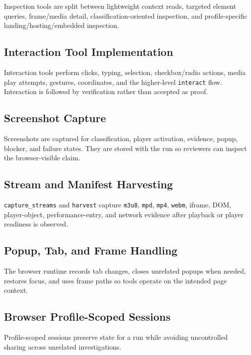 Inspection tools are split between lightweight context reads, targeted element
queries, frame/media detail, classification-oriented inspection, and
profile-specific landing/hosting/embedded inspection.

\subsection{Interaction Tool Implementation}

Interaction tools perform clicks, typing, selection, checkbox/radio actions,
media play attempts, gestures, coordinates, and the higher-level
\texttt{interact} flow. Interaction is followed by verification rather than
accepted as proof.

\subsection{Screenshot Capture}

Screenshots are captured for classification, player activation, evidence,
popup, blocker, and failure states. They are stored with the run so reviewers
can inspect the browser-visible claim.

\subsection{Stream and Manifest Harvesting}

\texttt{capture\_streams} and \texttt{harvest} capture \texttt{m3u8},
\texttt{mpd}, \texttt{mp4}, \texttt{webm}, iframe, DOM, player-object,
performance-entry, and network evidence after playback or player readiness is
observed.

\subsection{Popup, Tab, and Frame Handling}

The browser runtime records tab changes, closes unrelated popups when needed,
restores focus, and uses frame paths so tools operate on the intended page
context.

\subsection{Browser Profile-Scoped Sessions}

Profile-scoped sessions preserve state for a run while avoiding uncontrolled
sharing across unrelated investigations.

